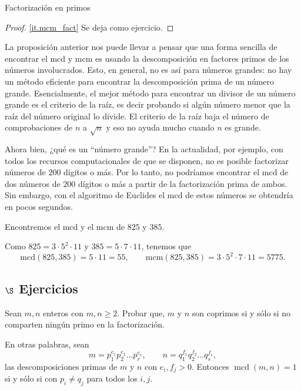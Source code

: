 \begin{section}{Factorización en primos}
\begin{proof}
\ref{it.mcm_fact}  Se deja como ejercicio. 
\end{proof}


\begin{observacion*} La proposición anterior nos puede llevar a pensar que una forma sencilla de encontrar el mcd y mcm  es usando la descomposición en factores primos de los números involucrados. Esto, en general, no es así para números grandes: no hay un método eficiente para encontrar la descomposición prima de un número grande. Esencialmente, el mejor método para encontrar un divisor de un número grande es el criterio de la raíz, es decir probando si algún número menor que la raíz del número original lo divide. El criterio de la raíz baja el número de comprobaciones de $n$ a $\sqrt{n}$ y eso no ayuda mucho cuando $n$ es grande.

 Ahora bien, ¿qué es un ``número grande''? En la actualidad, por ejemplo, con todos los recursos computacionales de que se disponen, no es posible factorizar números de $200$ dígitos o más. Por lo tanto, no podríamos encontrar el mcd  de dos números de $200$ dígitos o más a partir de la factorización prima de ambos. Sin embargo,  con el algoritmo de Euclides el mcd de estos números se obtendría en pocos segundos.     
\end{observacion*}


\begin{ejemplo*}
Encontremos el mcd y el mcm  de $825$ y $385$.

Como $825 =  3\cdot 5^2\cdot 11$ y $385 = 5\cdot 7\cdot 11$, tenemos que
$$
\text{mcd}(825,385) = 5\cdot 11 = 55, \qquad \text{mcm}(825,385) = 3\cdot 5^2\cdot 7\cdot 11 = 5775.
$$
\end{ejemplo*}



\subsection*{$\S$ Ejercicios}

\begin{enumex}
    \item Sean $m,n$ enteros con $m,n\ge 2$. Probar que,  $m$ y  $n$ son coprimos si y sólo si no comparten ningún primo en la factorización. 
    
    En otras palabras, sean  
    $$
    m=p_1^{e_1}p_2^{e_2}\ldots p_r^{e_r},\qquad
    n=q_1^{f_1}q_2^{f_2}\ldots q_s^{f_s},
    $$ 
    las descomposiciones primas de $m$ y $n$ con $e_i,f_j > 0$. Entonces  $\operatorname{mcd}(m,n) =1$ si y sólo si con $p_i \not= q_j$ para todos los $i,j$.  
    

\end{enumex}
\end{section}
